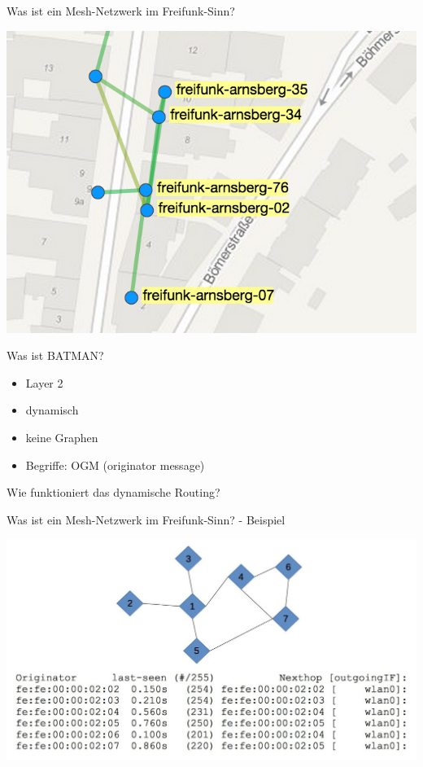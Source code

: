 \documentclass[ngerman,compress,aspectratio=169]{beamer}
\begin{document}
\begin{frame}{Was ist ein Mesh-Netzwerk im Freifunk-Sinn?}
	\begin{center}
		\includegraphics[scale=0.6]{mesh-network-2}
	\end{center}
\end{frame}

\begin{frame}{Was ist BATMAN?}
	\begin{itemize}
		\item Layer 2
		\item dynamisch
		\item keine Graphen
		\item Begriffe: OGM (originator message)
	\end{itemize}
\end{frame}

\begin{frame}
	\begin{center}
		\large{Wie funktioniert das dynamische Routing?}
	\end{center}
\end{frame}

\begin{frame}{Was ist ein Mesh-Netzwerk im Freifunk-Sinn? - Beispiel}
	\begin{center}
		\includegraphics[scale=0.25]{batman-example}
	\end{center}
\end{frame}
\end{document}
